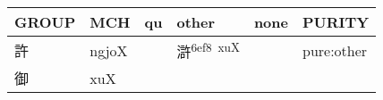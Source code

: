 \documentclass[14pt,a4paper]{scrartcl}
\begin{document}
\begin{longtable}[c]{@{}llllll@{}}
\toprule
\begin{minipage}[b]{0.14\columnwidth}\raggedright\strut
GROUP
\strut\end{minipage} &
\begin{minipage}[b]{0.14\columnwidth}\raggedright\strut
MCH
\strut\end{minipage} &
\begin{minipage}[b]{0.14\columnwidth}\raggedright\strut
qu
\strut\end{minipage} &
\begin{minipage}[b]{0.14\columnwidth}\raggedright\strut
other
\strut\end{minipage} &
\begin{minipage}[b]{0.14\columnwidth}\raggedright\strut
none
\strut\end{minipage} &
\begin{minipage}[b]{0.14\columnwidth}\raggedright\strut
PURITY
\strut\end{minipage}\tabularnewline
\midrule
\endhead
\begin{minipage}[t]{0.14\columnwidth}\raggedright\strut
許
\strut\end{minipage} &
\begin{minipage}[t]{0.14\columnwidth}\raggedright\strut
ngjoX
\strut\end{minipage} &
\begin{minipage}[t]{0.14\columnwidth}\raggedright\strut
\strut\end{minipage} &
\begin{minipage}[t]{0.14\columnwidth}\raggedright\strut
滸\textsuperscript{6ef8~xuX}
\strut\end{minipage} &
\begin{minipage}[t]{0.14\columnwidth}\raggedright\strut
\strut\end{minipage} &
\begin{minipage}[t]{0.14\columnwidth}\raggedright\strut
pure:other
\strut\end{minipage}\tabularnewline
\begin{minipage}[t]{0.14\columnwidth}\raggedright\strut
御
\strut\end{minipage} &
\begin{minipage}[t]{0.14\columnwidth}\raggedright\strut
xuX
\strut\end{minipage} &
\begin{minipage}[t]{0.14\columnwidth}\raggedright\strut
\strut\end{minipage} &

\end{longtable}
\end{document}
